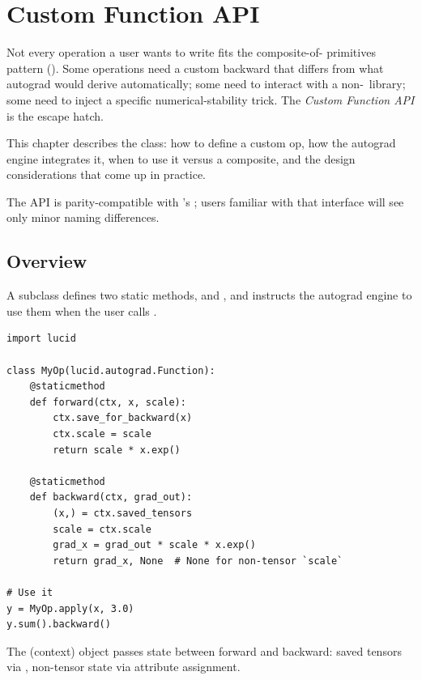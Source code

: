\chapter{Custom Function API}
\label{ch:custom_functions}

Not every operation a user wants to write fits the composite-of-
primitives pattern (). Some operations
need a custom backward that differs from what autograd would
derive automatically; some need to interact with a non-\Lucid\
library; some need to inject a specific numerical-stability
trick. The \emph{Custom Function API} is the escape hatch.

This chapter describes the  class:
how to define a custom op, how the autograd engine integrates it,
when to use it versus a composite, and the design considerations
that come up in practice.

The API is parity-compatible with 's
; users familiar with that interface
will see only minor naming differences.

\section{Overview}
\label{sec:custom_functions:overview}

A  subclass defines two static methods,
 and , and instructs the autograd
engine to use them when the user calls
.

\begin{lstlisting}[style=lucid,language=LucidPython]
import lucid

class MyOp(lucid.autograd.Function):
    @staticmethod
    def forward(ctx, x, scale):
        ctx.save_for_backward(x)
        ctx.scale = scale
        return scale * x.exp()

    @staticmethod
    def backward(ctx, grad_out):
        (x,) = ctx.saved_tensors
        scale = ctx.scale
        grad_x = grad_out * scale * x.exp()
        return grad_x, None  # None for non-tensor `scale`

# Use it
y = MyOp.apply(x, 3.0)
y.sum().backward()
\end{lstlisting}

The  (context) object passes state between forward and
backward: saved tensors via \code{ctx.save\_for\_backward(...)},
non-tensor state via attribute assignment.

